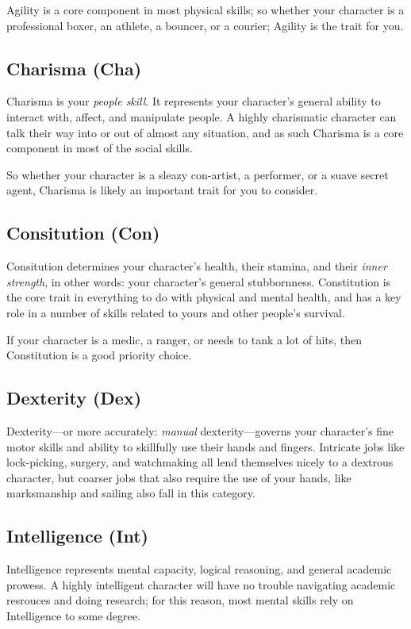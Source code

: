 Agility is a core component in most physical skills; so whether your character is a professional boxer, an athlete, a bouncer, or a courier; Agility is the trait for you.

\subsection{Charisma (Cha)}
Charisma is your \textit{people skill}.
It represents your character's general ability to interact with, affect, and manipulate people.
A highly charismatic character can talk their way into or out of almost any situation, and as such Charisma is a core component in most of the social skills.

So whether your character is a sleazy con-artist, a performer, or a suave secret agent, Charisma is likely an important trait for you to consider.

\subsection{Consitution (Con)}
Consitution determines your character's health, their stamina, and their \textit{inner strength}, in other words: your character's general stubbornness.
Constitution is the core trait in everything to do with physical and mental health, and has a key role in a number of skills related to yours and other people's survival.

If your character is a medic, a ranger, or needs to tank a lot of hits, then Constitution is a good priority choice.

\subsection{Dexterity (Dex)}
Dexterity---or more accurately: \textit{manual} dexterity---governs your character's fine motor skills and ability to skillfully use their hands and fingers.
Intricate jobs like lock-picking, surgery, and watchmaking all lend themselves nicely to a dextrous character, but coarser jobs that also require the use of your hands, like marksmanship and sailing also fall in this category.


\subsection{Intelligence (Int)}
Intelligence represents mental capacity, logical reasoning, and general academic prowess.
A highly intelligent character will have no trouble navigating academic resrouces and doing research; for this reason, most mental skills rely on Intelligence to some degree.

